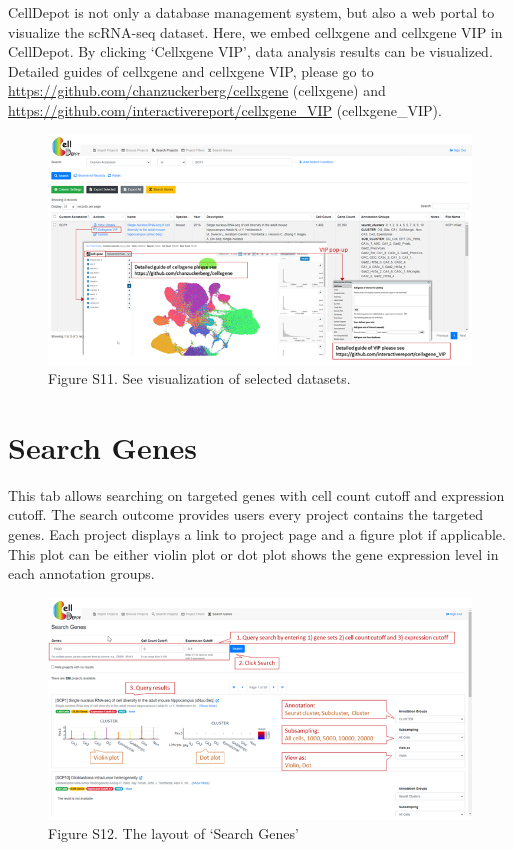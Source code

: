 \documentclass[
]{book}
\begin{document}
CellDepot is not only a database management system, but also a web portal to visualize the scRNA-seq dataset. Here, we embed cellxgene and cellxgene VIP in CellDepot. By clicking `Cellxgene VIP', data analysis results can be visualized. Detailed guides of cellxgene and cellxgene VIP, please go to \url{https://github.com/chanzuckerberg/cellxgene} (cellxgene) and \url{https://github.com/interactivereport/cellxgene_VIP} (cellxgene\_VIP).

\begin{figure}
\centering
\includegraphics{figures/S11.png}
\caption{Figure S11. See visualization of selected datasets.}
\end{figure}

\hypertarget{search-genes}{%
\section{Search Genes}\label{search-genes}}

This tab allows searching on targeted genes with cell count cutoff and expression cutoff. The search outcome provides users every project contains the targeted genes. Each project displays a link to project page and a figure plot if applicable. This plot can be either violin plot or dot plot shows the gene expression level in each annotation groups.

\begin{figure}
\centering
\includegraphics{figures/S12.png}
\caption{Figure S12. The layout of `Search Genes'}
\end{figure}
\end{document}
